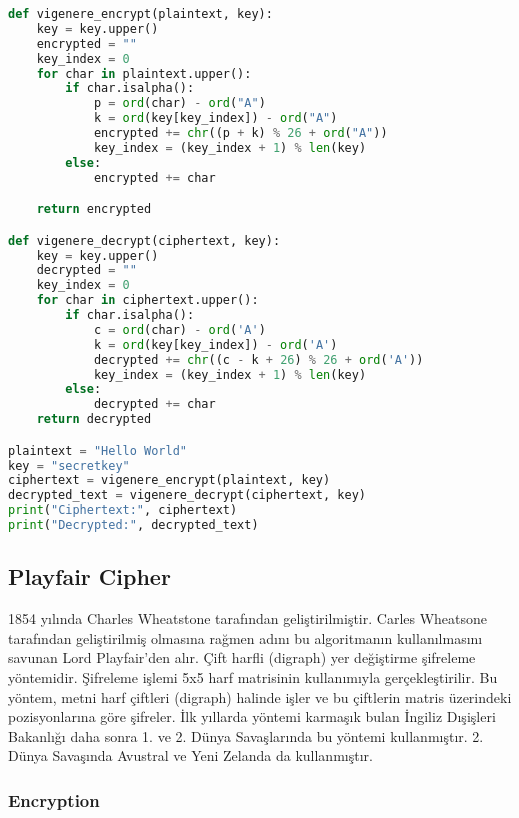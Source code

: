 \begin{lstlisting}[language=Python]
def vigenere_encrypt(plaintext, key):
    key = key.upper()
    encrypted = ""
    key_index = 0
    for char in plaintext.upper():
        if char.isalpha():
            p = ord(char) - ord("A")
            k = ord(key[key_index]) - ord("A")
            encrypted += chr((p + k) % 26 + ord("A"))
            key_index = (key_index + 1) % len(key)
        else:
            encrypted += char

    return encrypted

def vigenere_decrypt(ciphertext, key):
    key = key.upper()
    decrypted = ""
    key_index = 0
    for char in ciphertext.upper():
        if char.isalpha():
            c = ord(char) - ord('A')
            k = ord(key[key_index]) - ord('A')
            decrypted += chr((c - k + 26) % 26 + ord('A'))
            key_index = (key_index + 1) % len(key)
        else:
            decrypted += char 
    return decrypted

plaintext = "Hello World"
key = "secretkey"
ciphertext = vigenere_encrypt(plaintext, key)
decrypted_text = vigenere_decrypt(ciphertext, key)
print("Ciphertext:", ciphertext)
print("Decrypted:", decrypted_text)
\end{lstlisting}

\newpage

\subsection{Playfair Cipher}

1854 yılında Charles Wheatstone tarafından geliştirilmiştir. Carles Wheatsone tarafından geliştirilmiş olmasına rağmen adını bu algoritmanın kullanılmasını savunan Lord Playfair'den alır. Çift harfli (digraph) yer değiştirme şifreleme yöntemidir. Şifreleme işlemi 5x5 harf matrisinin kullanımıyla gerçekleştirilir. Bu yöntem, metni harf çiftleri (digraph) halinde işler ve bu çiftlerin matris üzerindeki pozisyonlarına göre şifreler. İlk yıllarda yöntemi karmaşık bulan İngiliz Dışişleri Bakanlığı daha sonra 1. ve 2. Dünya Savaşlarında bu yöntemi kullanmıştır. 2. Dünya Savaşında Avustral ve Yeni Zelanda da kullanmıştır.  

\subsubsection{Encryption}


